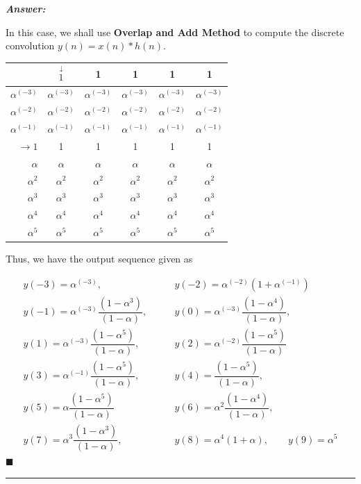 \documentclass[12pt]{article}
\theoremstyle{definition}
\newenvironment{answer}{
    \textbf{\textit{Answer:}} \qquad
}{\hfill $\blacksquare$ \\ 

\begin{center}
    \rule{0.8\linewidth}{1.5px} 
    \vspace*{1cm}   
\end{center}
}
\begin{document}
\begin{answer}
    In this case, we shall use \textbf{Overlap and Add Method} to compute the discrete convolution $y(n) = x(n) \ast h(n)$.

    \begin{table}[H]
        \centering
        \begin{tabular}{r|ccccc}
             & $\stackrel{\downarrow}{1}$ & 1 & 1 & 1 & 1\\
             \hline
            $\alpha^{(-3)}$ & $\alpha^{(-3)}$ & $\alpha^{(-3)}$ & $\alpha^{(-3)}$ & $\alpha^{(-3)}$ & $\alpha^{(-3)}$ \\
            $\alpha^{(-2)}$ & $\alpha^{(-2)}$ & $\alpha^{(-2)}$ & $\alpha^{(-2)}$ & $\alpha^{(-2)}$ & $\alpha^{(-2)}$ \\
            $\alpha^{(-1)}$ & $\alpha^{(-1)}$ & $\alpha^{(-1)}$ & $\alpha^{(-1)}$ & $\alpha^{(-1)}$ & $\alpha^{(-1)}$ \\
            $\rightarrow 1$ & 1 & 1 & 1 & 1 & 1\\
            $\alpha$ & $\alpha$ & $\alpha$ & $\alpha$ & $\alpha$ & $\alpha$\\
            $\alpha^2$ & $\alpha^2$ & $\alpha^2$ & $\alpha^2$ & $\alpha^2$ & $\alpha^2$\\
            $\alpha^3$ & $\alpha^3$ & $\alpha^3$ & $\alpha^3$ & $\alpha^3$ & $\alpha^3$\\
            $\alpha^4$ & $\alpha^4$ & $\alpha^4$ & $\alpha^4$ & $\alpha^4$ & $\alpha^4$\\
            $\alpha^5$ & $\alpha^5$ & $\alpha^5$ & $\alpha^5$ & $\alpha^5$ & $\alpha^5$\\
        \end{tabular}
    \end{table}

    Thus, we have the output sequence given as 


    \begingroup
    \allowdisplaybreaks
    \begin{align*}
        y(-3) = \alpha^{(-3)}, 
        & \qquad y(-2) = \alpha^{(-2)} (1 + \alpha^{(-1)})\\
        y(-1) = \alpha^{(-3)} \dfrac{(1 - \alpha^3)}{(1 - \alpha)}, & \qquad 
        y(0) = \alpha^{(-3)} \dfrac{(1 - \alpha^4)}{(1 - \alpha)},\\
        y(1) = \alpha^{(-3)} \dfrac{(1 - \alpha^5)}{(1 - \alpha)}, & \qquad
        y(2) = \alpha^{(-2)} \dfrac{(1 - \alpha^5)}{(1 - \alpha)} \\
        y(3) = \alpha^{(-1)} \dfrac{(1 - \alpha^5)}{(1 - \alpha)}, & \qquad
        y(4) = \dfrac{(1 - \alpha^5)}{(1 - \alpha)}, \\
        y(5) = \alpha \dfrac{(1 - \alpha^5)}{(1 - \alpha)}
        & \qquad
        y(6) = \alpha^2 \dfrac{(1 - \alpha^4)}{(1 - \alpha)},\\
        y(7) = \alpha^3 \dfrac{(1 - \alpha^3)}{(1 - \alpha)}, 
        & \qquad 
        y(8) = \alpha^4 (1 + \alpha), \qquad
        y(9) = \alpha^5
    \end{align*}
    \endgroup
\end{answer}
\end{document}
